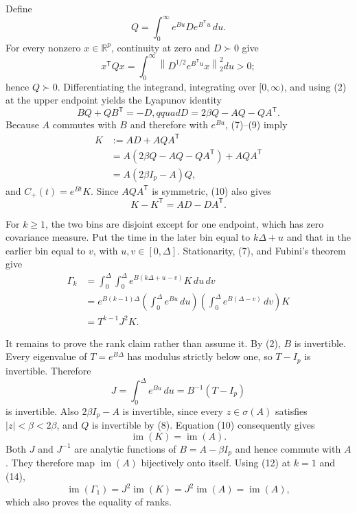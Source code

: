 Define
\[
 Q=\int_0^\infty e^{Bu}De^{B^{\mathsf T}u}\,du.
\]
For every nonzero \(x\in\mathbb R^p\), continuity at zero and \(D\succ0\) give
\[
 x^{\mathsf T}Qx
 =\int_0^\infty\left\|D^{1/2}e^{B^{\mathsf T}u}x\right\|_2^2du>0;
\tag{8}
\]
hence \(Q\succ0\).  Differentiating the integrand, integrating over \([0,\infty)\), and using (2) at the upper endpoint yields the Lyapunov identity
\[
 BQ+QB^{\mathsf T}=-D,qquad
 D=2\beta Q-AQ-QA^{\mathsf T}.
\tag{9}
\]
Because \(A\) commutes with \(B\) and therefore with \(e^{Bu}\), (7)--(9) imply
\[
 \begin{aligned}
 K
 &:=AD+AQA^{\mathsf T}\\
 &=A(2\beta Q-AQ-QA^{\mathsf T})+AQA^{\mathsf T}\\
 &=A(2\beta I_p-A)Q,
 \end{aligned}
\tag{10}
\]
and \(C_+(t)=e^{Bt}K\).  Since \(AQA^{\mathsf T}\) is symmetric, (10) also gives
\[
 K-K^{\mathsf T}=AD-DA^{\mathsf T}.
\tag{11}
\]

For \(k\geq1\), the two bins are disjoint except for one endpoint, which has zero covariance measure.  Put the time in the later bin equal to \(k\Delta+u\) and that in the earlier bin equal to \(v\), with \(u,v\in[0,\Delta]\).  Stationarity, (7), and Fubini's theorem give
\[
 \begin{aligned}
 \Gamma_k
 &=\int_0^\Delta\int_0^\Delta e^{B(k\Delta+u-v)}K\,du\,dv\\
 &=e^{B(k-1)\Delta}
 \left(\int_0^\Delta e^{Bu}\,du\right)
 \left(\int_0^\Delta e^{B(\Delta-v)}\,dv\right)K\\
 &=T^{k-1}J^2K.
 \end{aligned}
\tag{12}
\]

It remains to prove the rank claim rather than assume it.  By (2), \(B\) is invertible.  Every eigenvalue of \(T=e^{B\Delta}\) has modulus strictly below one, so \(T-I_p\) is invertible.  Therefore
\[
 J=\int_0^\Delta e^{Bu}\,du=B^{-1}(T-I_p)
\tag{13}
\]
is invertible.  Also \(2\beta I_p-A\) is invertible, since every \(z\in\sigma(A)\) satisfies \(|z|<\beta<2\beta\), and \(Q\) is invertible by (8).  Equation (10) consequently gives
\[
 \operatorname{im}(K)=\operatorname{im}(A).
\tag{14}
\]
Both \(J\) and \(J^{-1}\) are analytic functions of \(B=A-\beta I_p\) and hence commute with \(A\).  They therefore map \(\operatorname{im}(A)\) bijectively onto itself.  Using (12) at \(k=1\) and (14),
\[
 \operatorname{im}(\Gamma_1)=J^2\operatorname{im}(K)
 =J^2\operatorname{im}(A)=\operatorname{im}(A),
\]
which also proves the equality of ranks.